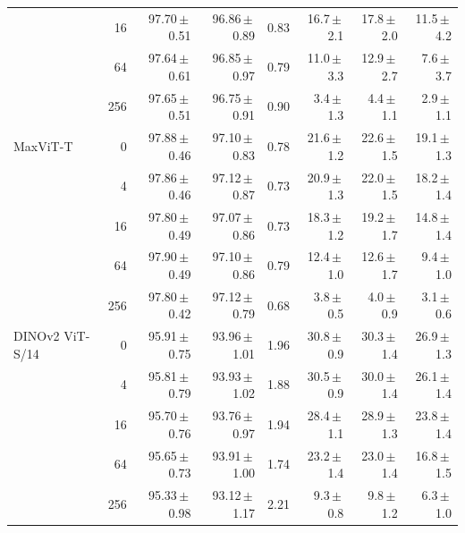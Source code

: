 {\begin{longtable}{lrrrrrrr}
 & 16 & 97.70\,$\pm$\,0.51 & 96.86\,$\pm$\,0.89 & 0.83 & 16.7\,$\pm$\,2.1 & 17.8\,$\pm$\,2.0 & 11.5\,$\pm$\,4.2 \\
 & 64 & 97.64\,$\pm$\,0.61 & 96.85\,$\pm$\,0.97 & 0.79 & 11.0\,$\pm$\,3.3 & 12.9\,$\pm$\,2.7 & 7.6\,$\pm$\,3.7 \\
 & 256 & 97.65\,$\pm$\,0.51 & 96.75\,$\pm$\,0.91 & 0.90 & 3.4\,$\pm$\,1.3 & 4.4\,$\pm$\,1.1 & 2.9\,$\pm$\,1.1 \\
MaxViT-T & 0 & 97.88\,$\pm$\,0.46 & 97.10\,$\pm$\,0.83 & 0.78 & 21.6\,$\pm$\,1.2 & 22.6\,$\pm$\,1.5 & 19.1\,$\pm$\,1.3 \\
 & 4 & 97.86\,$\pm$\,0.46 & 97.12\,$\pm$\,0.87 & 0.73 & 20.9\,$\pm$\,1.3 & 22.0\,$\pm$\,1.5 & 18.2\,$\pm$\,1.4 \\
 & 16 & 97.80\,$\pm$\,0.49 & 97.07\,$\pm$\,0.86 & 0.73 & 18.3\,$\pm$\,1.2 & 19.2\,$\pm$\,1.7 & 14.8\,$\pm$\,1.4 \\
 & 64 & 97.90\,$\pm$\,0.49 & 97.10\,$\pm$\,0.86 & 0.79 & 12.4\,$\pm$\,1.0 & 12.6\,$\pm$\,1.7 & 9.4\,$\pm$\,1.0 \\
 & 256 & 97.80\,$\pm$\,0.42 & 97.12\,$\pm$\,0.79 & 0.68 & 3.8\,$\pm$\,0.5 & 4.0\,$\pm$\,0.9 & 3.1\,$\pm$\,0.6 \\
DINOv2 ViT-S/14 & 0 & 95.91\,$\pm$\,0.75 & 93.96\,$\pm$\,1.01 & 1.96 & 30.8\,$\pm$\,0.9 & 30.3\,$\pm$\,1.4 & 26.9\,$\pm$\,1.3 \\
 & 4 & 95.81\,$\pm$\,0.79 & 93.93\,$\pm$\,1.02 & 1.88 & 30.5\,$\pm$\,0.9 & 30.0\,$\pm$\,1.4 & 26.1\,$\pm$\,1.4 \\
 & 16 & 95.70\,$\pm$\,0.76 & 93.76\,$\pm$\,0.97 & 1.94 & 28.4\,$\pm$\,1.1 & 28.9\,$\pm$\,1.3 & 23.8\,$\pm$\,1.4 \\
 & 64 & 95.65\,$\pm$\,0.73 & 93.91\,$\pm$\,1.00 & 1.74 & 23.2\,$\pm$\,1.4 & 23.0\,$\pm$\,1.4 & 16.8\,$\pm$\,1.5 \\
 & 256 & 95.33\,$\pm$\,0.98 & 93.12\,$\pm$\,1.17 & 2.21 & 9.3\,$\pm$\,0.8 & 9.8\,$\pm$\,1.2 & 6.3\,$\pm$\,1.0 \\
\end{longtable}
}
